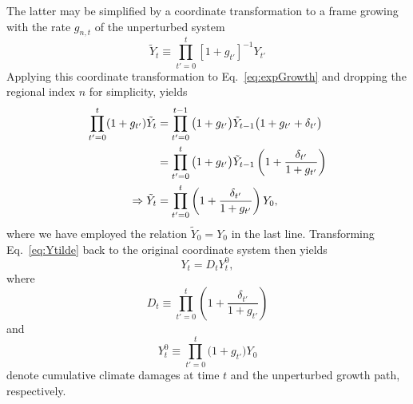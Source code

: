 \documentclass[preprint,3p,authoryear]{elsarticle}
\begin{document}
The latter may be simplified by a coordinate transformation to a frame growing with the rate $g_{n,t}$ of the unperturbed system
\begin{equation}
  \label{eq:growFrame}
  \tilde{Y}_t\equiv\prod_{t'=0}^t\left[1+g_{t'}\right]^{-1}Y_{t'}
\end{equation}
Applying this coordinate transformation to Eq.~\eqref{eq:expGrowth} and dropping the regional index $n$ for simplicity, yields
\begin{align}
\prod_{t'=0}^t(1+g_{t'})\tilde{Y}_t &= \prod_{t'=0}^{t-1}\big(1+g_{t'}\big)\tilde{Y}_{t-1}\big(1+g_{t'}+\delta_{t'}\big)\notag\\                                   &=\prod_{t'=0}^{t}\big(1+g_{t'}\big)\tilde{Y}_{t-1}\left(1+\frac{\delta_{t'}}{1+g_{t'}}\right)\notag\\
  \Rightarrow \tilde{Y}_{t} &= \prod_{t'=0}^{t}\left(1+\frac{\delta_{t'}}{1+g_{t'}}\right)Y_0\label{eq:Ytilde},
\end{align}
where we have employed the relation $\tilde{Y}_0=Y_0$ in the last line. Transforming Eq.~\eqref{eq:Ytilde} back to the original coordinate system then yields
\begin{equation}
  \label{eq:1}
  Y_t=D_tY^0_t,
\end{equation}
where
\begin{equation}
  \label{eq:D}
  D_t\equiv\prod_{t'=0}^{t}\left(1+\frac{\delta_{t'}}{1+g_{t'}}\right)
\end{equation}
and
\begin{equation}
  \label{eq:YNull}
 Y^0_t\equiv\prod_{t'=0}^{t} \big(1+g_{t'}\big)Y_0 
\end{equation}
 denote cumulative climate damages at time $t$ and the unperturbed growth path, respectively.
\end{document}

